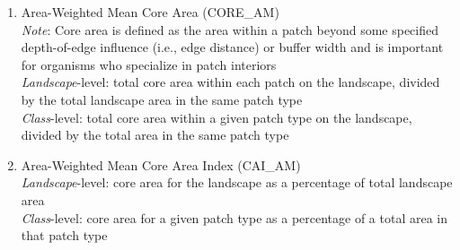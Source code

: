 \begin{itemize}
\begin{enumerate}
		
		\item Area-Weighted Mean Core Area (CORE\_AM)\\
		\emph{Note}: Core area is defined as the area within a patch beyond some specified depth-of-edge influence (i.e., edge distance) or buffer width and is important for organisms who specialize in patch interiors 	\\
		\emph{Landscape}-level: total core area within each patch on the landscape, divided by the total landscape area in the same patch type	\\
		\emph{Class}-level: total core area within a given patch type on the landscape, divided by the total area in the same patch type	\\
		
		\item Area-Weighted Mean Core Area Index (CAI\_AM)\\
		\emph{Landscape}-level: core area for the landscape as a percentage of total landscape area \\
		\emph{Class}-level: core area for a given patch type as a percentage of a total area in that patch type
		

\end{enumerate}
\end{itemize}
